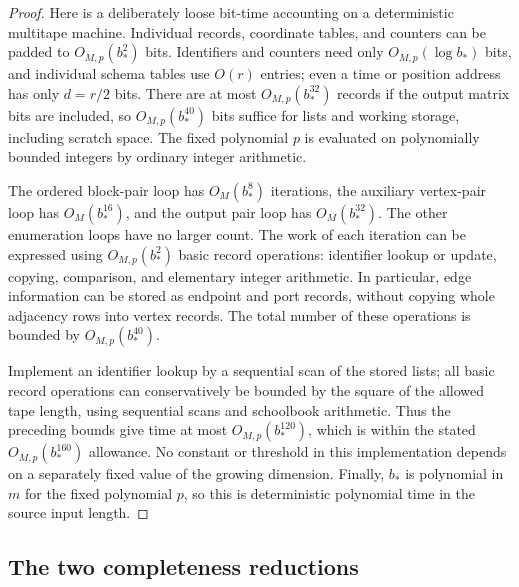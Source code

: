 \begin{proof}
Here is a deliberately loose bit-time accounting on a deterministic
multitape machine.  Individual records, coordinate tables, and counters
can be padded to $O_{M,p}(b_*^2)$ bits.  Identifiers and counters need only
$O_{M,p}(\log b_*)$ bits, and individual schema tables use $O(r)$ entries;
even a time or position address has only $d=r/2$ bits.  There are at most
$O_{M,p}(b_*^{32})$ records if the output matrix bits are included, so
$O_{M,p}(b_*^{40})$ bits suffice for lists and working storage, including
scratch space.  The fixed polynomial $p$ is evaluated on polynomially
bounded integers by ordinary integer arithmetic.

The ordered block-pair loop has $O_M(b_*^8)$ iterations, the auxiliary
vertex-pair loop has $O_M(b_*^{16})$, and the output pair loop has
$O_M(b_*^{32})$.  The other enumeration loops have no larger count.
The work of each iteration can be expressed using
$O_{M,p}(b_*^2)$ basic record operations: identifier lookup or update,
copying, comparison, and elementary integer arithmetic.  In particular,
edge information can be stored as endpoint and port records, without
copying whole adjacency rows into vertex records.  The total number of
these operations is bounded by $O_{M,p}(b_*^{40})$.

Implement an identifier lookup by a sequential scan of the stored lists;
all basic record operations can conservatively be bounded by the square
of the allowed tape length, using sequential scans and schoolbook
arithmetic.  Thus the preceding bounds give time at most
$O_{M,p}(b_*^{120})$, which is within the stated
$O_{M,p}(b_*^{160})$ allowance.  No constant or threshold in this
implementation depends on a separately fixed value of the growing
dimension.  Finally, $b_*$ is polynomial in $m$ for the fixed polynomial
$p$, so this is deterministic polynomial time in the source input length.
\end{proof}


\subsection{The two completeness reductions}

